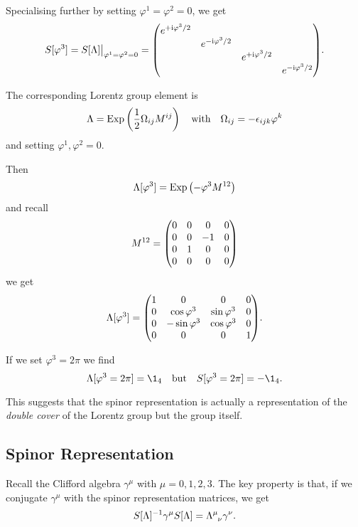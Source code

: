 \documentclass[a4paper,11pt]{article}
\begin{document}
	Specialising further by setting $\varphi^1 = \varphi^2 = 0$, we get
	\[
		S[\varphi^3] = S[\Lambda]\big| _{\varphi^1 = \varphi^2 = 0} = \mqty(\dmat{e ^{+\mathrm{i} \varphi^3/2},e ^{-\mathrm{i} \varphi^3/2},e ^{+\mathrm{i} \varphi^3/2},e ^{-\mathrm{i} \varphi^3/2}}).
	\]

	The corresponding Lorentz group element is
	\[
		\Lambda = \operatorname{Exp} \left( \frac{1}{2} \Omega _{ij} M ^{ij} \right) \quad \text{with} \quad \Omega _{ij} = - \epsilon _{ijk} \varphi^k
	\]
	and setting $\varphi^1, \varphi^2 = 0$.

	Then
	\[
		\Lambda[\varphi^3] = \operatorname{Exp} \left( - \varphi^3 M ^{12} \right)
	\]
	and recall
	\[
		M ^{12} = \mqty(0 & 0 & 0 & 0\\ 0 & 0 & -1 & 0 \\ 0 & 1 & 0 & 0\\ 0 & 0 & 0 & 0) 
	\]
	we get
	\[
		\Lambda[\varphi^3] = \mqty(1 & 0 & 0 & 0 \\ 0 & \cos \varphi^3 & \sin \varphi^3 & 0 \\ 0 & -\sin \varphi^3 & \cos \varphi^3 & 0 \\ 0 & 0 & 0 & 1).
	\]
	
	If we set $\varphi^3 = 2 \pi$ we find
	\[
		\Lambda [ \varphi^3 = 2 \pi] = \1_4 \quad \text{but} \quad S[\varphi^3 = 2 \pi] = - \1_4.
	\]
	
	This suggests that the spinor representation is actually a representation of the \emph{double cover} of the Lorentz group but the group itself.

	\subsection{Spinor Representation}

	Recall the Clifford algebra $\gamma^\mu$ with $\mu = 0,1,2,3$. The key property is that, if we conjugate $\gamma^\mu$ with the spinor representation matrices, we get
	\begin{equation}
		S[\Lambda]^{-1} \gamma^\mu S[\Lambda] = \LT{\mu}{\nu} \gamma^\nu.
		\label{eq:4.2.1}
	\end{equation}  
\end{document}
